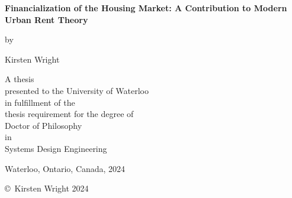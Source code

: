 \pagestyle{empty}

\begin{titlepage}
        \begin{center}
        \vspace*{1.0cm}

        \Huge
        {\bf Financialization of the Housing Market: A Contribution to Modern Urban Rent Theory}

        \vspace*{1.0cm}

        \normalsize
        by \\

        \vspace*{1.0cm}

        \Large
        Kirsten Wright \\

        \vspace*{3.0cm}

        \normalsize
        A thesis \\
        presented to the University of Waterloo \\ 
        in fulfillment of the \\
        thesis requirement for the degree of \\
        Doctor of Philosophy \\
        in \\
        Systems Design Engineering \\

        \vspace*{2.0cm}

        Waterloo, Ontario, Canada, 2024 \\

        \vspace*{1.0cm}

        \copyright\ Kirsten Wright 2024 \\
        \end{center}
\end{titlepage}

\pagestyle{plain}
\setcounter{page}{2}

\cleardoublepage %
 
